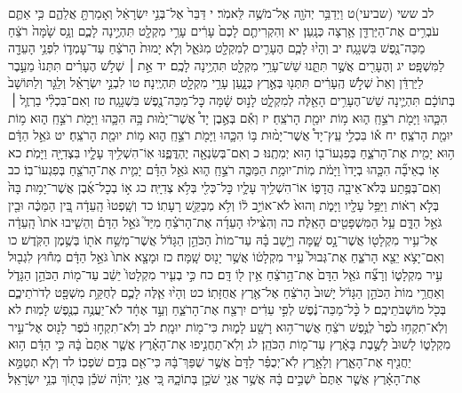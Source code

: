 \documentclass[twoside, openany, parskip=half, 11pt]{book}
\begin{document}
לב ששי (שביעי)ט וַיְדַבֵּ֥ר יְהֹוָ֖ה אֶל־מֹשֶׁ֥ה לֵּאמֹֽר׃ י דַּבֵּר֙ אֶל־בְּנֵ֣י יִשְׂרָאֵ֔ל וְאָמַרְתָּ֖ אֲלֵהֶ֑ם כִּ֥י אַתֶּ֛ם עֹבְרִ֥ים אֶת־הַיַּרְדֵּ֖ן אַ֥רְצָה כְּנָֽעַן׃ יא וְהִקְרִיתֶ֤ם לָכֶם֙ עָרִ֔ים עָרֵ֥י מִקְלָ֖ט תִּהְיֶ֣ינָה לָכֶ֑ם וְנָ֥ס שָׁ֙מָּה֙ רֹצֵ֔חַ מַכֵּה־נֶ֖פֶשׁ בִּשְׁגָגָֽה׃ יב וְהָי֨וּ לָכֶ֧ם הֶעָרִ֛ים לְמִקְלָ֖ט מִגֹּאֵ֑ל וְלֹ֤א יָמוּת֙ הָרֹצֵ֔חַ עַד־עׇמְד֛וֹ לִפְנֵ֥י הָעֵדָ֖ה לַמִּשְׁפָּֽט׃ יג וְהֶעָרִ֖ים אֲשֶׁ֣ר תִּתֵּ֑נוּ שֵׁשׁ־עָרֵ֥י מִקְלָ֖ט תִּהְיֶ֥ינָה לָכֶֽם׃ יד אֵ֣ת ׀ שְׁלֹ֣שׁ הֶעָרִ֗ים תִּתְּנוּ֙ מֵעֵ֣בֶר לַיַּרְדֵּ֔ן וְאֵת֙ שְׁלֹ֣שׁ הֶֽעָרִ֔ים תִּתְּנ֖וּ בְּאֶ֣רֶץ כְּנָ֑עַן עָרֵ֥י מִקְלָ֖ט תִּהְיֶֽינָה׃ טו לִבְנֵ֣י יִשְׂרָאֵ֗ל וְלַגֵּ֤ר וְלַתּוֹשָׁב֙ בְּתוֹכָ֔ם תִּהְיֶ֛ינָה שֵׁשׁ־הֶעָרִ֥ים הָאֵ֖לֶּה לְמִקְלָ֑ט לָנ֣וּס שָׁ֔מָּה כׇּל־מַכֵּה־נֶ֖פֶשׁ בִּשְׁגָגָֽה׃ טז וְאִם־בִּכְלִ֨י בַרְזֶ֧ל ׀ הִכָּ֛הוּ וַיָּמֹ֖ת רֹצֵ֣חַֽ ה֑וּא מ֥וֹת יוּמַ֖ת הָרֹצֵֽחַ׃ יז וְאִ֡ם בְּאֶ֣בֶן יָד֩ אֲשֶׁר־יָמ֨וּת בָּ֥הּ הִכָּ֛הוּ וַיָּמֹ֖ת רֹצֵ֣חַֽ ה֑וּא מ֥וֹת יוּמַ֖ת הָרֹצֵֽחַ׃ יח א֡וֹ בִּכְלִ֣י עֵֽץ־יָד֩ אֲשֶׁר־יָמ֨וּת בּ֥וֹ הִכָּ֛הוּ וַיָּמֹ֖ת רֹצֵ֣חַֽ ה֑וּא מ֥וֹת יוּמַ֖ת הָרֹצֵֽחַ׃ יט גֹּאֵ֣ל הַדָּ֔ם ה֥וּא יָמִ֖ית אֶת־הָרֹצֵ֑חַ בְּפִגְעוֹ־ב֖וֹ ה֥וּא יְמִתֶֽנּוּ׃ כ וְאִם־בְּשִׂנְאָ֖ה יֶהְדֳּפֶ֑נּוּ אֽוֹ־הִשְׁלִ֥יךְ עָלָ֛יו בִּצְדִיָּ֖ה וַיָּמֹֽת׃ כא א֣וֹ בְאֵיבָ֞ה הִכָּ֤הוּ בְיָדוֹ֙ וַיָּמֹ֔ת מֽוֹת־יוּמַ֥ת הַמַּכֶּ֖ה רֹצֵ֣חַֽ ה֑וּא גֹּאֵ֣ל הַדָּ֗ם יָמִ֛ית אֶת־הָרֹצֵ֖חַ בְּפִגְעוֹ־בֽוֹ׃ כב וְאִם־בְּפֶ֥תַע בְּלֹא־אֵיבָ֖ה הֲדָפ֑וֹ אוֹ־הִשְׁלִ֥יךְ עָלָ֛יו כׇּל־כְּלִ֖י בְּלֹ֥א צְדִיָּֽה׃ כג א֣וֹ בְכׇל־אֶ֜בֶן אֲשֶׁר־יָמ֥וּת בָּהּ֙ בְּלֹ֣א רְא֔וֹת וַיַּפֵּ֥ל עָלָ֖יו וַיָּמֹ֑ת וְהוּא֙ לֹא־אוֹיֵ֣ב ל֔וֹ וְלֹ֥א מְבַקֵּ֖שׁ רָעָתֽוֹ׃ כד וְשָֽׁפְטוּ֙ הָֽעֵדָ֔ה בֵּ֚ין הַמַּכֶּ֔ה וּבֵ֖ין גֹּאֵ֣ל הַדָּ֑ם עַ֥ל הַמִּשְׁפָּטִ֖ים הָאֵֽלֶּה׃ כה וְהִצִּ֨ילוּ הָעֵדָ֜ה אֶת־הָרֹצֵ֗חַ מִיַּד֮ גֹּאֵ֣ל הַדָּם֒ וְהֵשִׁ֤יבוּ אֹתוֹ֙ הָֽעֵדָ֔ה אֶל־עִ֥יר מִקְלָט֖וֹ אֲשֶׁר־נָ֣ס שָׁ֑מָּה וְיָ֣שַׁב בָּ֗הּ עַד־מוֹת֙ הַכֹּהֵ֣ן הַגָּדֹ֔ל אֲשֶׁר־מָשַׁ֥ח אֹת֖וֹ בְּשֶׁ֥מֶן הַקֹּֽדֶשׁ׃ כו וְאִם־יָצֹ֥א יֵצֵ֖א הָרֹצֵ֑חַ אֶת־גְּבוּל֙ עִ֣יר מִקְלָט֔וֹ אֲשֶׁ֥ר יָנ֖וּס שָֽׁמָּה׃ כז וּמָצָ֤א אֹתוֹ֙ גֹּאֵ֣ל הַדָּ֔ם מִח֕וּץ לִגְב֖וּל עִ֣יר מִקְלָט֑וֹ וְרָצַ֞ח גֹּאֵ֤ל הַדָּם֙ אֶת־הָ֣רֹצֵ֔חַ אֵ֥ין ל֖וֹ דָּֽם׃ כח כִּ֣י בְעִ֤יר מִקְלָטוֹ֙ יֵשֵׁ֔ב עַד־מ֖וֹת הַכֹּהֵ֣ן הַגָּדֹ֑ל וְאַחֲרֵ֥י מוֹת֙ הַכֹּהֵ֣ן הַגָּדֹ֔ל יָשׁוּב֙ הָרֹצֵ֔חַ אֶל־אֶ֖רֶץ אֲחֻזָּתֽוֹ׃ כט וְהָי֨וּ אֵ֧לֶּה לָכֶ֛ם לְחֻקַּ֥ת מִשְׁפָּ֖ט לְדֹרֹתֵיכֶ֑ם בְּכֹ֖ל מוֹשְׁבֹתֵיכֶֽם׃ ל כׇּ֨ל־מַכֵּה־נֶ֔פֶשׁ לְפִ֣י עֵדִ֔ים יִרְצַ֖ח אֶת־הָרֹצֵ֑חַ וְעֵ֣ד אֶחָ֔ד לֹא־יַעֲנֶ֥ה בְנֶ֖פֶשׁ לָמֽוּת׃ לא וְלֹֽא־תִקְח֥וּ כֹ֙פֶר֙ לְנֶ֣פֶשׁ רֹצֵ֔חַ אֲשֶׁר־ה֥וּא רָשָׁ֖ע לָמ֑וּת כִּי־מ֖וֹת יוּמָֽת׃ לב וְלֹא־תִקְח֣וּ כֹ֔פֶר לָנ֖וּס אֶל־עִ֣יר מִקְלָט֑וֹ לָשׁוּב֙ לָשֶׁ֣בֶת בָּאָ֔רֶץ עַד־מ֖וֹת הַכֹּהֵֽן׃ לג וְלֹֽא־תַחֲנִ֣יפוּ אֶת־הָאָ֗רֶץ אֲשֶׁ֤ר אַתֶּם֙ בָּ֔הּ כִּ֣י הַדָּ֔ם ה֥וּא יַחֲנִ֖יף אֶת־הָאָ֑רֶץ וְלָאָ֣רֶץ לֹֽא־יְכֻפַּ֗ר לַדָּם֙ אֲשֶׁ֣ר שֻׁפַּךְ־בָּ֔הּ כִּי־אִ֖ם בְּדַ֥ם שֹׁפְכֽוֹ׃ לד וְלֹ֧א תְטַמֵּ֣א אֶת־הָאָ֗רֶץ אֲשֶׁ֤ר אַתֶּם֙ יֹשְׁבִ֣ים בָּ֔הּ אֲשֶׁ֥ר אֲנִ֖י שֹׁכֵ֣ן בְּתוֹכָ֑הּ כִּ֚י אֲנִ֣י יְהֹוָ֔ה שֹׁכֵ֕ן בְּת֖וֹךְ בְּנֵ֥י יִשְׂרָאֵֽל׃
\end{document}
